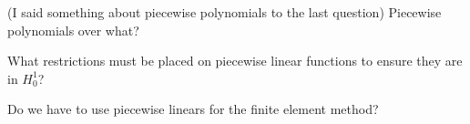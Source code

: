 \documentclass[12pt]{article}
\newenvironment{problem}[2][Problem]{\begin{trivlist}
\item[\hskip \labelsep {\bfseries #1}\hskip \labelsep {\bfseries #2.}]}{\end{trivlist}}
\begin{document}
\begin{problem}{}
(I said something about piecewise polynomials to the last question)  Piecewise polynomials over what?
\end{problem}

\begin{problem}{}
What restrictions must be placed on piecewise linear functions to ensure they are in $H^1_0$?
\end{problem}

\begin{problem}{}
Do we have to use piecewise linears for the finite element method?
\end{problem}
\end{document}
